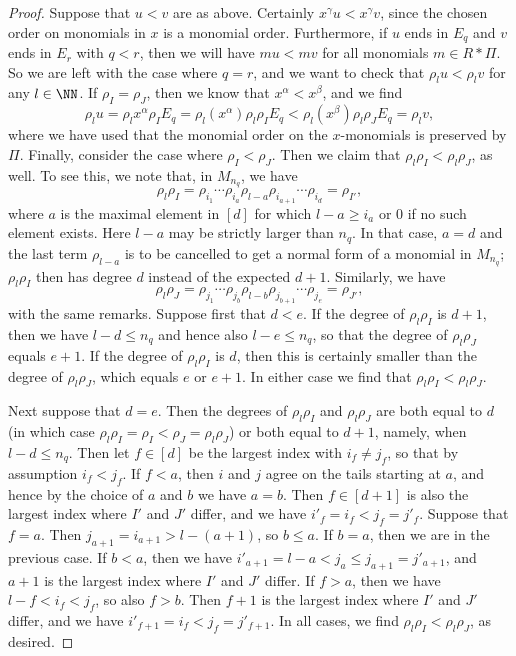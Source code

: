 \documentclass{amsart}
\begin{document}
\begin{proof}
Suppose that $u<v$ are as above. Certainly $x^\gamma u < x^\gamma
v$, since the chosen order on monomials in $x$ is a monomial order.
Furthermore, if $u$ ends in $E_q$ and $v$ ends in $E_r$ with $q<r$,
then we will have $m u < m v$ for all monomials $m \in R*\Pi$. So we are
left with the case where $q=r$, and we want to check that $\rho_l u <
\rho_l v$ for any $l \in \NN$. If $\rho_I=\rho_J$, then we know that
$x^\alpha<x^\beta$, and we find
\[ \rho_l u=
\rho_l x^\alpha \rho_I E_q=
\rho_l(x^\alpha) \rho_l \rho_I E_q<
\rho_l(x^\beta) \rho_l \rho_J E_q=
\rho_l v, \]
where we have used that the monomial order on the $x$-monomials is
preserved by $\Pi$. Finally, consider the case where $\rho_I<\rho_J$.
Then we claim that $\rho_l \rho_I < \rho_l \rho_J$, as well. To see this,
we note that, in $M_{n_q}$, we have
\[ \rho_l \rho_I=\rho_{i_1} \cdots \rho_{i_a} \rho_{l-a} \rho_{i_{a+1}}
\cdots \rho_{i_d}=\rho_{I'}, \]
where $a$ is the maximal element in $[d]$ for which $l-a \geq i_a$
or $0$ if no such element exists. Here $l-a$ may be strictly larger
than $n_q$. In that case, $a=d$ and the last term $\rho_{l-a}$ is to be
cancelled to get a normal form of a monomial in $M_{n_q}$; $\rho_l \rho_I$
then has degree $d$ instead of the expected $d+1$. Similarly, we have
\[ \rho_l \rho_J=\rho_{j_1} \cdots \rho_{j_b} \rho_{l-b}
\rho_{j_{b+1}} \cdots \rho_{j_e}=\rho_{J'}, \]
with the same remarks. Suppose first that $d<e$. If the degree of
$\rho_l \rho_I$ is $d+1$, then we have $l-d \leq n_q$ and hence also
$l-e \leq n_q$, so that the degree of $\rho_l \rho_J$ equals $e+1$.
If the degree of $\rho_l \rho_I$ is $d$, then this is certainly smaller
than the degree of $\rho_l \rho_J$, which equals $e$ or $e+1$. In either
case we find that $\rho_l \rho_I < \rho_l \rho_J$.

Next suppose that $d=e$. Then the degrees of $\rho_l \rho_I$
and $\rho_l \rho_J$ are both equal to $d$ (in which case $\rho_l
\rho_I=\rho_I<\rho_J=\rho_l \rho_J$) or both equal to $d+1$, namely,
when $l-d \leq n_q$. Then let $f \in [d]$ be the largest index with $i_f
\neq j_f$, so that by assumption $i_f<j_f$. If $f < a$, then $i$ and $j$
agree on the tails starting at $a$, and hence by the choice of $a$ and $b$
we have $a=b$. Then $f \in [d+1]$ is also the largest index where $I'$
and $J'$ differ, and we have $i'_f=i_f<j_f=j'_f$. Suppose that $f=a$.
Then $j_{a+1}=i_{a+1} > l-(a+1)$, so $b \leq a$. If $b=a$, then we are
in the previous case. If $b<a$, then we have $i'_{a+1}=l-a < j_a \leq
j_{a+1}=j'_{a+1}$, and $a+1$ is the largest index where $I'$ and $J'$
differ.  If $f>a$, then we have $l-f<i_f<j_f$, so also $f>b$. Then
$f+1$ is the largest index where $I'$ and $J'$ differ, and we have
$i'_{f+1}=i_f<j_f=j'_{f+1}$. In all cases, we find $\rho_l \rho_I <
\rho_l \rho_J$, as desired.
\end{proof}
\end{document}
